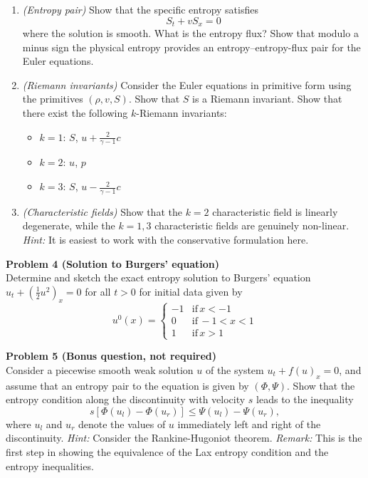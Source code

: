 \documentclass[letter,11pt]{article}
\begin{document}
\begin{enumerate}
  \item \emph{(Entropy pair)} Show that the specific entropy satisfies
  \begin{equation}
    S_t + v S_x = 0
  \end{equation}
  where the solution is smooth. What is the entropy flux? Show that modulo a minus sign the physical entropy provides an entropy--entropy-flux pair for the Euler equations.

  \item \emph{(Riemann invariants)} Consider the Euler equations in primitive form using the primitives $(\rho,v,S)$. Show that $S$ is a Riemann invariant. Show that there exist the following $k$-Riemann invariants:
  \begin{itemize}
    \item $k = 1$: $S$, $u+ \frac{2}{\gamma - 1}c$
    \item $k = 2$: $u$, $p$
    \item $k = 3$: $S$, $u- \frac{2}{\gamma - 1}c$
  \end{itemize}

  \item \emph{(Characteristic fields)} Show that the $k=2$ characteristic field is linearly degenerate, while the $k=1,3$ characteristic fields are genuinely non-linear. \emph{Hint:} It is easiest to work with the conservative formulation here.

\end{enumerate}

\vspace{1cm}

{\noindent\large\textbf{Problem 4 (Solution to Burgers' equation)}}\\

\noindent Determine and sketch the exact entropy solution to Burgers' equation $u_t + (\frac{1}{2}u^2)_x = 0$ for all $t>0$ for initial data given by
\begin{equation}
  u^0(x) = \left\{ \begin{array}{ll}
  -1 & \mathrm{if}\, x<-1 \\
  0 & \mathrm{if}\, -1<x<1 \\
  1 & \mathrm{if}\, x>1
  \end{array}\right.
\end{equation}

\vspace{1cm}

{\noindent\large\textbf{Problem 5 (Bonus question, not required)}}\\

\noindent Consider a piecewise smooth weak solution $u$ of the system $u_t + f(u)_x = 0$, and assume that an entropy pair to the equation is given by $(\Phi,\Psi)$. Show that the entropy condition along the discontinuity with velocity $s$ leads to the inequality
\begin{equation}
  s[\Phi(u_l) - \Phi(u_r)] \le \Psi(u_l) - \Psi(u_r),
\end{equation}
where $u_l$ and $u_r$ denote the values of $u$ immediately left and right of the discontinuity.
\emph{Hint:} Consider the Rankine-Hugoniot theorem.
\emph{Remark:} This is the first step in showing the equivalence of the Lax entropy condition and the entropy inequalities.
\end{document}
